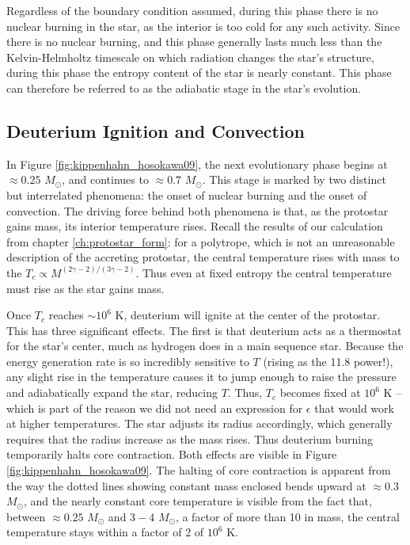 Regardless of the boundary condition assumed, during this phase there is no nuclear burning in the star, as the interior is too cold for any such activity. Since there is no nuclear burning, and this phase generally lasts much less than the Kelvin-Helmholtz timescale on which radiation changes the star's structure, during this phase the entropy content of the star is nearly constant. This phase can therefore be referred to as the adiabatic stage in the star's evolution.


\subsection{Deuterium Ignition and Convection}

In Figure \ref{fig:kippenhahn_hosokawa09}, the next evolutionary phase begins at $\approx 0.25$ $M_\odot$, and continues to $\approx 0.7$ $M_\odot$. This stage is marked by two distinct but interrelated phenomena: the onset of nuclear burning and the onset of convection. The driving force behind both phenomena is that, as the protostar gains mass, its interior temperature rises. Recall the results of our calculation from chapter \ref{ch:protostar_form}: for a polytrope, which is not an unreasonable description of the accreting protostar, the central temperature rises with mass to the $T_c\propto M^{(2\gamma-2)/(3\gamma-2)}$. Thus even at fixed entropy the central temperature must rise as the star gains mass.

Once $T_c$ reaches $\sim 10^6$ K, deuterium will ignite at the center of the protostar. This has three significant effects. The first is that deuterium acts as a thermostat for the star's center, much as hydrogen does in a main sequence star. Because the energy generation rate is so incredibly sensitive to $T$ (rising as the 11.8 power!), any slight rise in the temperature causes it to jump enough to raise the pressure and adiabatically expand the star, reducing $T$. Thus, $T_c$ becomes fixed at $10^6$ K -- which is part of the reason we did not need an expression for $\epsilon$ that would work at higher temperatures. The star adjusts its radius accordingly, which generally requires that the radius increase as the mass rises. Thus deuterium burning temporarily halts core contraction. Both effects are visible in Figure \ref{fig:kippenhahn_hosokawa09}. The halting of core contraction is apparent from the way the dotted lines showing constant mass enclosed bends upward at $\approx 0.3$ $M_\odot$, and the nearly constant core temperature is visible from the fact that, between $\approx 0.25$ $M_\odot$ and $3-4$ $M_\odot$, a factor of more than 10 in mass, the central temperature stays within a factor of 2 of $10^6$ K.

